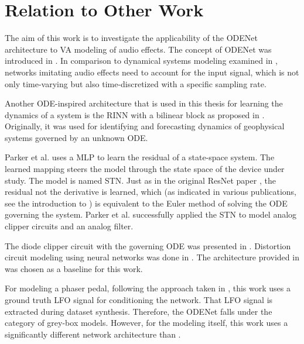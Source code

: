 \section{Relation to Other Work}
\label{sec:relation_to_other_work}
The aim of this work is to investigate the applicability of the ODENet architecture to \ac{VA} modeling of audio effects. The concept of ODENet was introduced in \cite{Chen2018}. In comparison to dynamical systems modeling examined in \cite{Karlsson2019}, networks imitating audio effects need to account for the input signal, which is not only time-varying but also time-discretized with a specific sampling rate. 

Another \ac{ODE}-inspired architecture that is used in this thesis for learning the dynamics of a system is the \ac{RINN} with a bilinear block as proposed in \cite{Fablet2017,Ouala2019}. Originally, it was used for identifying and forecasting dynamics of geophysical systems governed by an unknown ODE.

Parker et al. \cite{Parker2019} uses a \ac{MLP} to learn the residual of a state-space system. The learned mapping steers the model through the state space of the device under study. The model is named \ac{STN}. Just as in the original \ac{ResNet} paper \cite{He2015}, the residual not the derivative is learned, which (as indicated in various publications, see the introduction to \cite{Chen2018}) is equivalent to the Euler method of solving the \ac{ODE} governing the system. Parker et al. \cite{Parker2019} successfully applied the \ac{STN} to model analog clipper circuits and an analog filter.

The diode clipper circuit with the governing \ac{ODE} was presented in \cite{Yeh2007,Yeh2008}. Distortion circuit modeling using neural networks was done in \cite{Wright2019,Wright2019a, Wrightetal2020}. The architecture provided in \cite{Wright2019} was chosen as a baseline for this work.

For modeling a phaser pedal, following the approach taken in \cite{Wright2020}, this work uses a ground truth \ac{LFO} signal for conditioning the network. That \ac{LFO} signal is extracted during dataset synthesis. Therefore, the ODENet falls under the category of grey-box models. However, for the modeling itself, this work uses a significantly different network architecture than \cite{Wright2020}.

